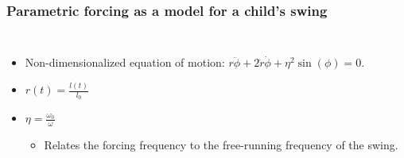 \documentclass[swedish, english]{beamer}
\begin{document}
\begin{frame}
\frametitle{Parametric forcing as a model for a child’s swing}

\begin{columns}[c]

\centerline{
\resizebox{.7\textwidth}{!}{
}
}

\begin{itemize}
\item Non-dimensionalized equation of motion:
$r\ddot\phi + 2\dot{r}\dot\phi + \eta^2\sin(\phi)=0$.\\
\vspace{5mm}

\item $r(t)=\frac{l(t)}{l_0}$
\item $\eta=\frac{\omega_0}{\omega}$ 
\begin{itemize}
\item Relates the forcing frequency to
the free-running frequency of the swing.
\end{itemize}
\end{itemize}

\end{columns}
\end{frame}




 
\end{document}
